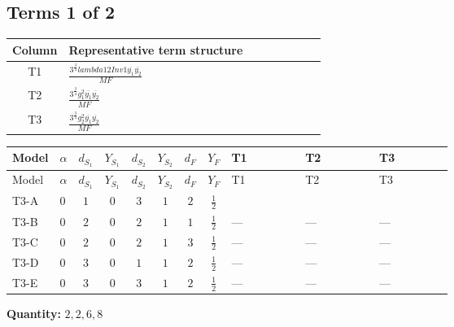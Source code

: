 \documentclass[8pt]{article}
\begin{document}
\begin{landscape}
\subsection*{Terms 1 of 2}
\begin{center}
\begin{tabular}{@{}c >{\raggedright\arraybackslash}p{0.82\linewidth}@{}}
\toprule
Column & Representative term structure \\
\midrule
T1 & \(\displaystyle \frac{3^{\frac{3}{4}} lambda12Inv1 \overline{y_{1}} \overline{y_{2}}}{MF}\) \\
\midrule
T2 & \(\displaystyle \frac{3^{\frac{3}{4}} g_{1}^{2} \overline{y_{1}} \overline{y_{2}}}{MF}\) \\
\midrule
T3 & \(\displaystyle \frac{3^{\frac{3}{4}} g_{2}^{2} \overline{y_{1}} \overline{y_{2}}}{MF}\) \\
\midrule
\bottomrule
\end{tabular}
\end{center}
\smallskip
\tiny
\begin{longtable}{@{}llcccccc >{\raggedright\arraybackslash}p{0.21\linewidth} >{\raggedright\arraybackslash}p{0.21\linewidth} >{\raggedright\arraybackslash}p{0.21\linewidth}@{}}
\toprule
Model & $\alpha$ & $d_{S_1}$ & $Y_{S_1}$ & $d_{S_2}$ & $Y_{S_2}$ & $d_F$ & $Y_F$ & T1 & T2 & T3 \\
\midrule
\endfirsthead
\toprule
Model & $\alpha$ & $d_{S_1}$ & $Y_{S_1}$ & $d_{S_2}$ & $Y_{S_2}$ & $d_F$ & $Y_F$ & T1 & T2 & T3 \\
\midrule
\endhead
T3-A & $0$ & $1$ & $0$ & $3$ & $1$ & $2$ & $\frac{1}{2}$ & \scriptsize\adjustbox{max width=\linewidth}{$\begin{gathered} \frac{3^{\frac{3}{4}} lambda12Inv1 \overline{y_{1}} \overline{y_{2}}}{6 MF}\end{gathered}$} & \scriptsize\adjustbox{max width=\linewidth}{$\begin{gathered} \frac{3^{\frac{3}{4}} g_{1}^{2} \overline{y_{1}} \overline{y_{2}}}{8 MF}\end{gathered}$} & \scriptsize\adjustbox{max width=\linewidth}{$\begin{gathered} \frac{17 \cdot 3^{\frac{3}{4}} g_{2}^{2} \overline{y_{1}} \overline{y_{2}}}{24 MF}\end{gathered}$} \\
\midrule
T3-B & $0$ & $2$ & $0$ & $2$ & $1$ & $1$ & $\frac{1}{2}$ & --- & --- & --- \\
\midrule
T3-C & $0$ & $2$ & $0$ & $2$ & $1$ & $3$ & $\frac{1}{2}$ & --- & --- & --- \\
\midrule
T3-D & $0$ & $3$ & $0$ & $1$ & $1$ & $2$ & $\frac{1}{2}$ & --- & --- & --- \\
\midrule
T3-E & $0$ & $3$ & $0$ & $3$ & $1$ & $2$ & $\frac{1}{2}$ & --- & --- & --- \\
\midrule
\bottomrule
\end{longtable}
\clearpage
\noindent\textbf{Quantity: }$\mathrm{2,2,6,8}$\par\smallskip

\end{landscape}
\end{document}
